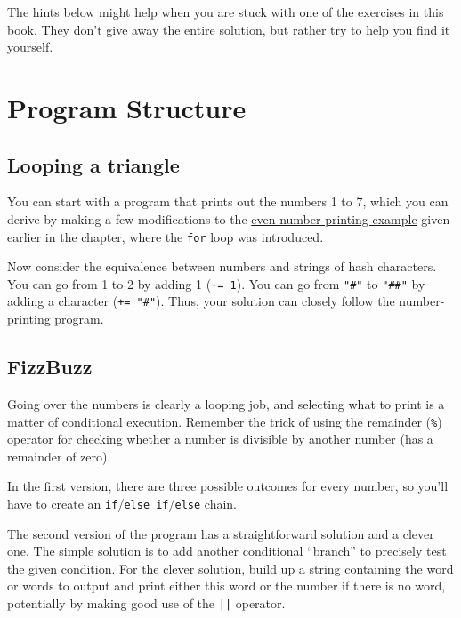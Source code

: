 \label{hints}

The hints below might help when you are stuck with one of the exercises in this book. They don't give away the entire solution, but rather try to help you find it yourself.

\section{Program Structure}

\subsection{Looping a triangle}

You can start with a program that prints out the numbers 1 to 7, which you can derive by making a few modifications to the \hyperref[program_structure.loops]{even number printing example} given earlier in the chapter, where the \lstinline`for` loop was introduced.

Now consider the equivalence between numbers and strings of hash characters. You can go from 1 to 2 by adding 1 (\lstinline`+= 1`). You can go from \lstinline`"#"` to \lstinline`"##"` by adding a character (\lstinline`+= "#"`). Thus, your solution can closely follow the number-printing program.

\subsection{FizzBuzz}

Going over the numbers is clearly a looping job, and selecting what to print is a matter of conditional execution. Remember the trick of using the remainder (\lstinline`%`) operator for checking whether a number is divisible by another number (has a remainder of zero).

In the first version, there are three possible outcomes for every number, so you'll have to create an \lstinline`if`/\lstinline`else if`/\lstinline`else` chain.

The second version of the program has a straightforward solution and a clever one. The simple solution is to add another conditional ``branch'' to precisely test the given condition. For the clever solution, build up a string containing the word or words to output and print either this word or the number if there is no word, potentially by making good use of the \lstinline`||` operator.

